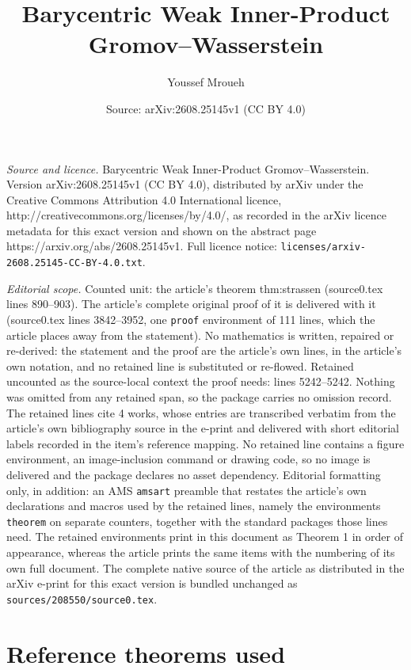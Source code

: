 \documentclass[10pt,a4paper]{amsart}
\title{Barycentric Weak Inner-Product Gromov--Wasserstein}
\author{Youssef Mroueh}
\date{Source: arXiv:2608.25145v1 (CC BY 4.0)}
\begin{document}
\maketitle

\noindent\emph{Source and licence.} Barycentric Weak Inner-Product Gromov--Wasserstein. Version arXiv:2608.25145v1 (CC BY 4.0), distributed by arXiv under the Creative Commons Attribution 4.0 International licence, http://creativecommons.org/licenses/by/4.0/, as recorded in the arXiv licence metadata for this exact version and shown on the abstract page https://arxiv.org/abs/2608.25145v1. Full licence notice: \texttt{licenses/arxiv-2608.25145-CC-BY-4.0.txt}.\par\smallskip

\noindent\textit{Editorial scope.} Counted unit: the article's theorem thm:strassen (source0.tex lines 890--903). The article's complete original proof of it is delivered with it (source0.tex lines 3842--3952, one \texttt{proof} environment of 111 lines, which the article places away from the statement). No mathematics is written, repaired or re-derived: the statement and the proof are the article's own lines, in the article's own notation, and no retained line is substituted or re-flowed.  Retained uncounted as the source-local context the proof needs: lines 5242--5242.  Nothing was omitted from any retained span, so the package carries no omission record.  The retained lines cite 4 works, whose entries are transcribed verbatim from the article's own bibliography source in the e-print and delivered with short editorial labels recorded in the item's reference mapping.  No retained line contains a figure environment, an image-inclusion command or drawing code, so no image is delivered and the package declares no asset dependency.  Editorial formatting only, in addition: an AMS \texttt{amsart} preamble that restates the article's own declarations and macros used by the retained lines, namely the environments \texttt{theorem} on separate counters, together with the standard packages those lines need.  The retained environments print in this document as Theorem 1 in order of appearance, whereas the article prints the same items with the numbering of its own full document.  The complete native source of the article as distributed in the arXiv e-print for this exact version is bundled unchanged as \texttt{sources/208550/source0.tex}.
\section{Reference theorems used}\label{app:reference-theorems}
\end{document}
